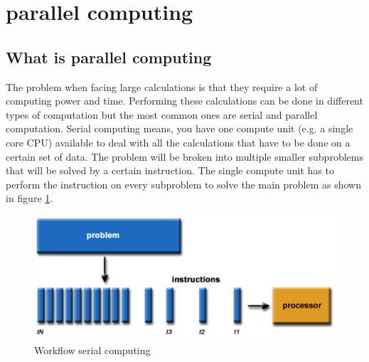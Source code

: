 \documentclass[a4paper, 11pt]{report}
\begin{document}
\section{parallel computing}
	\subsection{What is parallel computing}
The problem when facing large calculations is that they require a lot of computing power and time. Performing these calculations can be done in different types of computation but the most common ones are serial and parallel computation. Serial computing means, you have one compute unit (e.g. a single core CPU) available to deal with all the calculations that have to be done on a certain set of data. The problem will be broken into multiple smaller subproblems that will be solved by a certain instruction. The single compute unit has to perform the instruction on every subproblem to solve the main problem as shown in figure \ref{fig:SerialC}.
	\begin{figure}[h]
		\centering
		\includegraphics[scale=.4]{images/serialProblem.pdf}
		\caption{Workflow serial computing}
		\label{fig:SerialC}
	\end{figure}
\end{document}
